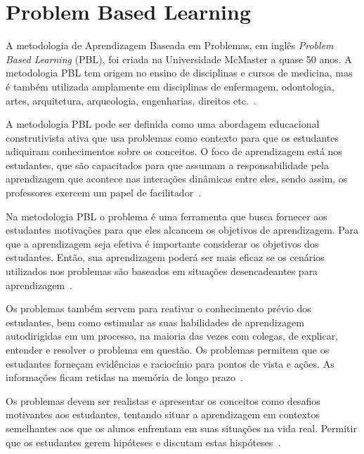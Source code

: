\acresetall
\section{Problem Based Learning}

A metodologia de Aprendizagem Baseada em Problemas, em inglês \textit{Problem Based Learning} (PBL),
foi criada na Universidade McMaster a quase 50 anos.
A metodologia PBL tem origem no ensino de disciplinas e cursos de medicina, mas é também utilizada
amplamente em disciplinas de enfermagem,
odontologia, artes, arquitetura, arqueologia, engenharias, direitos
etc.~\cite{albanese2010problem, amos1998problem}.

A metodologia PBL pode ser definida como uma abordagem educacional
construtivista ativa que usa problemas como contexto para que os estudantes
adiquiram conhecimentos sobre os conceitos. O foco de aprendizagem está
nos estudantes, que são capacitados para que assumam a responsabilidade pela
aprendizagem que acontece nas interações dinâmicas
entre eles, sendo assim, os professores exercem um papel
de facilitador~\cite{dolmans2005problem, albanese2010problem,
amos1998problem, forsythe2002problem}.

Na metodologia PBL o problema é uma ferramenta que busca fornecer
aos estudantes motivações para que eles alcancem os
objetivos de aprendizagem.
Para que a aprendizagem seja efetiva é importante considerar os objetivos
dos estudantes.
Então, sua aprendizagem poderá ser mais eficaz se os cenários utilizados
nos problemas são baseados em situações desencadeantes para
aprendizagem~\cite{wood2003problem, o2012practical, amos1998problem}.

Os problemas também servem para reativar o conhecimento prévio dos
estudantes, bem como estimular as suas habilidades de aprendizagem
autodirigidas em um processo, na maioria das vezes com colegas,
de explicar, entender e resolver o problema em
questão.
Os problemas permitem que os estudantes forneçam evidências
e raciocínio para pontos de vista e ações.
As informações ficam retidas na memória de longo
prazo~\cite{des1999delphi, azer2012twelve}.

Os problemas devem ser realistas e apresentar os conceitos como
desafios motivantes aos estudantes, tentando situar a
aprendizagem em contextos semelhantes aos que os alunos
enfrentam em suas situações na vida real.
Permitir que os estudantes gerem hipóteses e discutam
estas hispóteses~\cite{albanese2010problem, azer2012twelve}.

